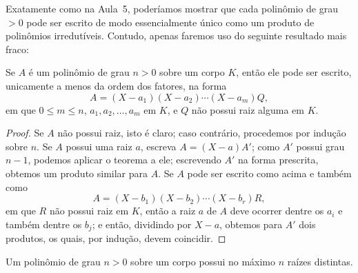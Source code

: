 Exatamente como na Aula~5, poderíamos mostrar que cada polinômio de grau $> 0$ 
pode ser escrito de modo essencialmente único como um produto de polinômios 
irredutíveis. Contudo, apenas faremos uso do seguinte resultado mais fraco:

\begin{proposicao}
Se $A$ é um polinômio de grau $n > 0$ sobre um corpo $K$, então ele pode ser escrito,
unicamente a menos da ordem dos fatores, na forma
\[
A = (X - a_1)(X - a_2)\cdots(X - a_m)Q,
\]
em que $0 \le m \le n$, $a_1, a_2, \ldots, a_m$ em $K$, e $Q$ não possui raiz alguma em $K$.    
\end{proposicao}

\begin{proof}
Se $A$ não possui raiz, isto é claro; caso contrário, procedemos por indução sobre $n$.
Se $A$ possui uma raiz $a$, escreva $A = (X - a)A'$;
como $A'$ possui grau $n - 1$, podemos aplicar o teorema a ele; escrevendo $A'$ na forma
prescrita, obtemos um produto similar para $A$.
Se $A$ pode ser escrito como acima e também como
\[
A = (X - b_1)(X - b_2)\cdots(X - b_r)R,
\]
em que $R$ não possui raiz em $K$, então a raiz $a$ de $A$ deve ocorrer dentre os $a_i$
e também dentre os $b_j$; e então, dividindo por $X - a$, obtemos para $A'$ dois produtos,
os quais, por indução, devem coincidir.
\end{proof}

\begin{corolario}
    Um polinômio de grau $n > 0$ sobre um corpo possui no máximo $n$ raízes distintas.
\end{corolario}

